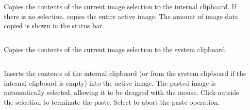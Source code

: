 Copies the contents of the current image selection to the internal
clipboard. If there is no selection, copies the entire active image.
The amount of image data copied is shown in the status bar. 




\subsection{\protect{}\label{sub:Copy-to-System}}

Copies the contents of the current image selection to the system clipboard.




\subsection{\protect{}\label{sub:Paste[v]}}

Inserts the contents of the internal clipboard (or from the system
clipboard if the internal clipboard is empty) into the active image.
The pasted image is automatically selected, allowing it to be dragged
with the mouse. Click outside the selection to terminate the paste.
Select  to abort
the paste operation.




\subsection{\protect{}\label{sub:Paste-Control...}}

